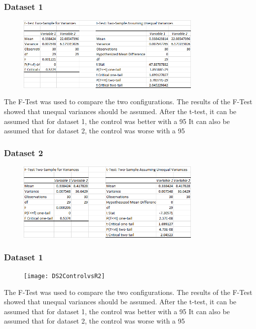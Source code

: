 \documentclass{article}
\begin{document}
\subsubsection{Dataset 1}
\begin{figure}[h]
	\centering
	\includegraphics[width=0.8\textwidth]{DS2ControlvsMu}
\end{figure}
\begin{paragraph}
The F-Test was used to compare the two configurations. The results of the F-Test showed that
unequal variances should be assumed. After the t-test, it can be assumed that for dataset 1, the control was better with a 95%
It can also be assumed that for dataset 2, the control was worse with a 95%
\\
\end{paragraph}
\subsubsection{Dataset 2}
\begin{figure}[h]
	\centering
	\includegraphics[width=0.8\textwidth]{DS2ControlvsR1}
\end{figure}
\subsubsection{Dataset 1}
\begin{figure}[h]
	\centering
	\texttt{[image: DS2ControlvsR2]}
\end{figure}
\begin{paragraph}
The F-Test was used to compare the two configurations. The results of the F-Test showed that
unequal variances should be assumed. After the t-test, it can be assumed that for dataset 1, the control was better with a 95%
It can also be assumed that for dataset 2, the control was worse with a 95%
\\
\end{paragraph}
\end{document}
